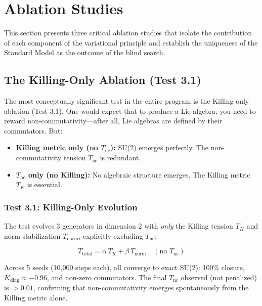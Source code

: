 \section{Ablation Studies}\label{sec:ablative}

This section presents three critical ablation studies that isolate the contribution of each component of the variational principle and establish the uniqueness of the Standard Model as the outcome of the blind search.

\subsection{The Killing-Only Ablation (Test 3.1)}\label{sec:killing_only}

The most conceptually significant test in the entire program is the Killing-only ablation (Test 3.1). One would expect that to produce a Lie algebra, you need to reward non-commutativity---after all, Lie algebras are defined by their commutators. But:

\begin{itemize}
\item \textbf{Killing metric only (no $T_{\mathrm{nc}}$):} SU(2) emerges perfectly. The non-commutativity tension $T_{\mathrm{nc}}$ is redundant.

\item \textbf{$T_{\mathrm{nc}}$ only (no Killing):} No algebraic structure emerges. The Killing metric $T_K$ is essential.
\end{itemize}

\subsubsection{Test 3.1: Killing-Only Evolution}

The test evolves 3 generators in dimension 2 with \textit{only} the Killing tension $T_K$ and norm stabilization $T_{\mathrm{norm}}$, explicitly excluding $T_{\mathrm{nc}}$:

\begin{equation}
T_{\mathrm{total}} = \alpha \, T_K + \beta \, T_{\mathrm{norm}} \quad (\text{no } T_{\mathrm{nc}})
\end{equation}

Across 5 seeds (10,000 steps each), all converge to exact SU(2): 100\% closure, $K_{\mathrm{diag}} \approx -0.96$, and non-zero commutators. The final $T_{\mathrm{nc}}$ observed (not penalized) is $> 0.01$, confirming that non-commutativity emerges spontaneously from the Killing metric alone.

